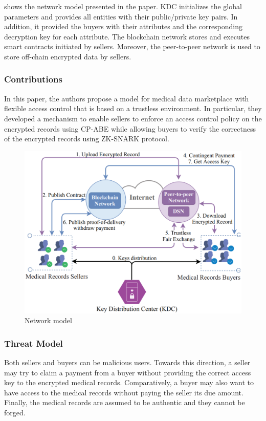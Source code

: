  shows the network model presented in the paper.
KDC initializes the global parameters and provides all entities with their public/private key pairs.
In addition, it provided the buyers with their attributes and the corresponding decryption key for each attribute.
The blockchain network stores and executes smart contracts initiated by sellers.
Moreover, the peer-to-peer network is used to store off-chain encrypted data by sellers.


\subsubsection{Contributions}
In this paper, the authors propose a model for medical data marketplace with flexible access control that is based on a trustless environment.
In particular, they developed a mechanism to enable sellers to enforce an access control policy on the encrypted records using CP-ABE while allowing buyers to verify the correctness of the encrypted records using ZK-SNARK protocol.

\begin{figure}
\centering
  \includegraphics[width=1\linewidth]{imgs/20-network-model.eps}
  \caption{Network model~\cite{alsharif2020blockchain}}
  \label{fig:20-network-model}
\end{figure}

\subsubsection{Threat Model}
Both sellers and buyers can be malicious users.
Towards this direction, a seller may try to claim a payment from a buyer without providing the correct access key to the encrypted medical records.
Comparatively, a buyer may also want to have access to the medical records without paying the seller its due amount.
Finally, the medical records are assumed to be authentic and they cannot be forged.

